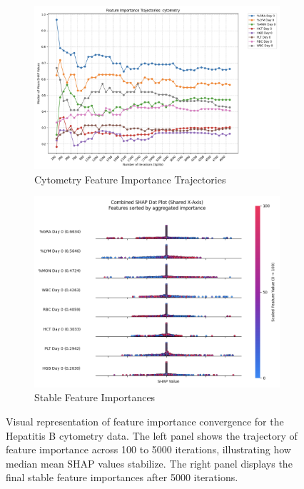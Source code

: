 \documentclass[12pt,a4paper]{report}
\begin{document}
\begin{figure}[h!]
    \centering

    \begin{subfigure}[b]{0.48\textwidth}
    \centering
    \includegraphics[width=\textwidth]{images/trajectory_cytometry_hepatitis.png}
    \caption{Cytometry Feature Importance Trajectories}
    \label{fig:trajectory_cytometry_hepatitis}
    \end{subfigure}
    \hfill
    \begin{subfigure}[b]{0.48\textwidth}
    \centering
    \includegraphics[width=\textwidth]{images/stable_features_cytometry_hepatitis.png}
    \caption{Stable Feature Importances}
    \label{fig:stable_features_cytometry_hepatitis}
    \end{subfigure}

    \caption[Hepatitis B Feature Importance Convergence]{Visual representation of feature importance convergence for the Hepatitis B cytometry data. The left panel shows the trajectory of feature importance across 100 to 5000 iterations, illustrating how median mean SHAP values stabilize. The right panel displays the final stable feature importances after 5000 iterations.}
    \label{fig:feature_trajectories_plots_hepatitis}
\end{figure}
\end{document}
